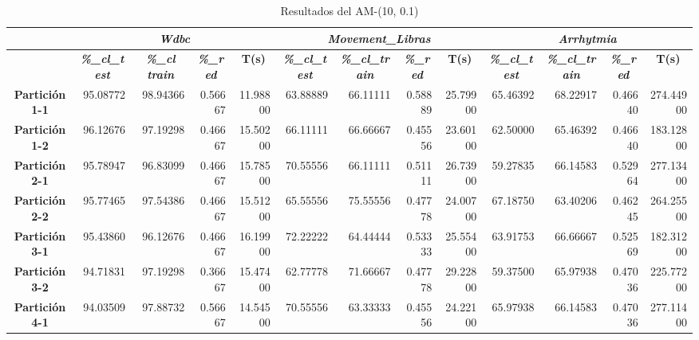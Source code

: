\documentclass[a4paper,11pt]{article}
\begin{document}
  \begin{table}[H]	
  \caption{Resultados del AM-(10, 0.1)}
  \begin{adjustbox}{width=1.1\textwidth}
 \begin{tabular}{|c|r|r|r|r|r|r|r|r|r|r|r|r|}
  \hline
  \multicolumn{1}{|l|}{} & \multicolumn{ 4}{c|}{\textbf{\textit{Wdbc}}} & \multicolumn{ 4}{c|}{\textbf{\textit{Movement\_Libras}}} & \multicolumn{ 4}{c|}{\textbf{\textit{Arrhytmia}}} \\ \hline
  \multicolumn{1}{|l|}{} & \multicolumn{1}{c|}{\textbf{\textit{\%\_cl\_test}}} & \multicolumn{1}{c|}{\textbf{\textit{\%\_cl train}}} & \multicolumn{1}{c|}{\textbf{\textit{\%\_red}}} & \multicolumn{1}{c|}{\textbf{T(s)}} & \multicolumn{1}{c|}{\textbf{\textit{\%\_cl\_test}}} & \multicolumn{1}{c|}{\textbf{\textit{\%\_cl\_train}}} & \multicolumn{1}{c|}{\textbf{\textit{\%\_red}}} & \multicolumn{1}{c|}{\textbf{T(s)}} & \multicolumn{1}{c|}{\textbf{\textit{\%\_cl\_test}}} & \multicolumn{1}{c|}{\textbf{\textit{\%\_cl\_train}}} & \multicolumn{1}{c|}{\textbf{\textit{\%\_red}}} & \multicolumn{1}{c|}{\textbf{T(s)}} \\ \hline
  \textbf{Partición 1-1} & 95.08772 & 98.94366 & 0.56667 & 11.98800 & 63.88889 & 66.11111 & 0.58889 & 25.79900 & 65.46392 & 68.22917 & 0.46640 & 274.44900 \\ \hline
  \textbf{Partición 1-2} & 96.12676 & 97.19298 & 0.46667 & 15.50200 & 66.11111 & 66.66667 & 0.45556 & 23.60100 & 62.50000 & 65.46392 & 0.46640 & 183.12800 \\ \hline
  \textbf{Partición 2-1} & 95.78947 & 96.83099 & 0.46667 & 15.78500 & 70.55556 & 66.11111 & 0.51111 & 26.73900 & 59.27835 & 66.14583 & 0.52964 & 277.13400 \\ \hline
  \textbf{Partición 2-2} & 95.77465 & 97.54386 & 0.46667 & 15.51200 & 65.55556 & 75.55556 & 0.47778 & 24.00700 & 67.18750 & 63.40206 & 0.46245 & 264.25500 \\ \hline
  \textbf{Partición 3-1} & 95.43860 & 96.12676 & 0.46667 & 16.19900 & 72.22222 & 64.44444 & 0.53333 & 25.55400 & 63.91753 & 66.66667 & 0.52569 & 182.31200 \\ \hline
  \textbf{Partición 3-2} & 94.71831 & 97.19298 & 0.36667 & 15.47400 & 62.77778 & 71.66667 & 0.47778 & 29.22800 & 59.37500 & 65.97938 & 0.47036 & 225.77200 \\ \hline
  \textbf{Partición 4-1} & 94.03509 & 97.88732 & 0.56667 & 14.54500 & 70.55556 & 63.33333 & 0.45556 & 24.22100 & 65.97938 & 66.14583 & 0.47036 & 277.11400 \\ \hline

\end{tabular}
\end{adjustbox}
\end{table}
\end{document}
